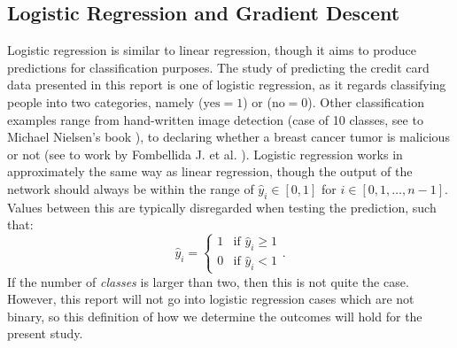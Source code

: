     \subsection{Logistic Regression and Gradient Descent}
        Logistic regression is similar to linear regression, though it aims to produce predictions for classification purposes. The study of predicting the credit card data presented in this report is one of logistic regression, as it regards classifying people into two categories, namely ($\text{yes}=1$) or ($\text{no}=0$). Other classification examples range from hand-written image detection (case of 10 classes, see to Michael Nielsen's book \cite{nielsenneural}), to declaring whether a breast cancer tumor is malicious or not (see to work by Fombellida J. et al. \cite{breastcancer}). Logistic regression works in approximately the same way as linear regression, though the output of the network should always be within the range of $\hat{y}_i\in [0,1]$ for $i \in [0,1,\hdots,n-1]$. Values between this are typically disregarded when testing the prediction,
        such that:
        \begin{equation}
            \hat{y}_i = \begin{cases} 1 & \text{if } \hat{y}_i\geq 1 \\ 0 & \text{if } \hat{y}_i < 1 \end{cases}.
        \end{equation}
        If the number of \textit{classes} is larger than two, %
        then this is not quite the case. However, this report will not go into logistic regression cases which are not binary, so this definition of how we determine the outcomes will hold for the present study.
